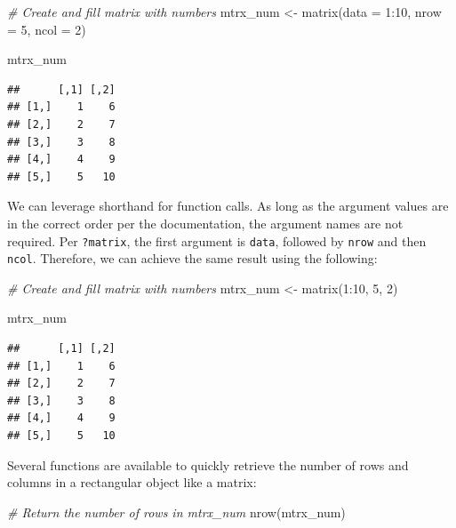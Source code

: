 \documentclass[
]{book}
\newenvironment{Shaded}{\begin{snugshade}}{\end{snugshade}}
\newcommand{\AttributeTok}[1]{\textcolor[rgb]{0.77,0.63,0.00}{#1}}
\newcommand{\CommentTok}[1]{\textcolor[rgb]{0.56,0.35,0.01}{\textit{#1}}}
\newcommand{\DecValTok}[1]{\textcolor[rgb]{0.00,0.00,0.81}{#1}}
\newcommand{\FunctionTok}[1]{\textcolor[rgb]{0.00,0.00,0.00}{#1}}
\newcommand{\NormalTok}[1]{#1}
\newcommand{\OtherTok}[1]{\textcolor[rgb]{0.56,0.35,0.01}{#1}}
\newcommand{\SpecialCharTok}[1]{\textcolor[rgb]{0.00,0.00,0.00}{#1}}
\begin{document}
\begin{Shaded}
\begin{Highlighting}[]
\CommentTok{\# Create and fill matrix with numbers}
\NormalTok{mtrx\_num }\OtherTok{\textless{}{-}} \FunctionTok{matrix}\NormalTok{(}\AttributeTok{data =} \DecValTok{1}\SpecialCharTok{:}\DecValTok{10}\NormalTok{, }\AttributeTok{nrow =} \DecValTok{5}\NormalTok{, }\AttributeTok{ncol =} \DecValTok{2}\NormalTok{)}

\NormalTok{mtrx\_num}
\end{Highlighting}
\end{Shaded}

\begin{verbatim}
##      [,1] [,2]
## [1,]    1    6
## [2,]    2    7
## [3,]    3    8
## [4,]    4    9
## [5,]    5   10
\end{verbatim}

We can leverage shorthand for function calls. As long as the argument values are in the correct order per the documentation, the argument names are not required. Per \texttt{?matrix}, the first argument is \texttt{data}, followed by \texttt{nrow} and then \texttt{ncol}. Therefore, we can achieve the same result using the following:

\begin{Shaded}
\begin{Highlighting}[]
\CommentTok{\# Create and fill matrix with numbers}
\NormalTok{mtrx\_num }\OtherTok{\textless{}{-}} \FunctionTok{matrix}\NormalTok{(}\DecValTok{1}\SpecialCharTok{:}\DecValTok{10}\NormalTok{, }\DecValTok{5}\NormalTok{, }\DecValTok{2}\NormalTok{)}

\NormalTok{mtrx\_num}
\end{Highlighting}
\end{Shaded}

\begin{verbatim}
##      [,1] [,2]
## [1,]    1    6
## [2,]    2    7
## [3,]    3    8
## [4,]    4    9
## [5,]    5   10
\end{verbatim}

Several functions are available to quickly retrieve the number of rows and columns in a rectangular object like a matrix:

\begin{Shaded}
\begin{Highlighting}[]
\CommentTok{\# Return the number of rows in mtrx\_num}
\FunctionTok{nrow}\NormalTok{(mtrx\_num)}
\end{Highlighting}
\end{Shaded}
\end{document}
